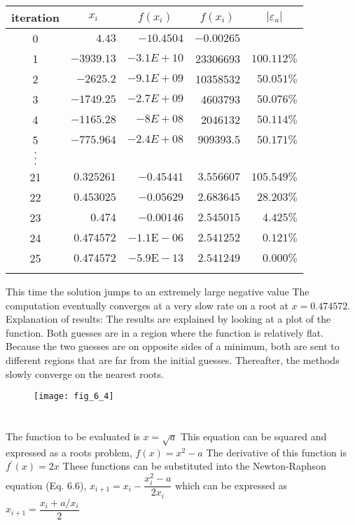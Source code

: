 \documentclass[../main.tex]{subfiles}
\begin{document}
\begin{enumerate}[label=\bfseries(\alph*)]
\begin{tabular}{crrrr}
\Xhline{1.5pt}
iteration & \multicolumn{1}{c}{$x_{i}$} & \multicolumn{1}{c}{$f\left(x_{i}\right)$} & \multicolumn{1}{c}{$f\left(x_{i}\right)$} & \multicolumn{1}{c}{$\left|\varepsilon_{a}\right|$} \\
\hline
0 & $4.43$ & $-10.4504$ & $-0.00265$ &  \\
1 & $-3939.13$ & $-3.1 E+10$ & 23306693 & $100.112 \%$ \\
2 & $-2625.2$ & $-9.1 E+09$ & 10358532 & $50.051 \%$ \\
3 & $-1749.25$ & $-2.7 E+09$ & 4603793 & $50.076 \%$ \\
4 & $-1165.28$ & $-8 E+08$ & 2046132 & $50.114 \%$ \\
5 & $-775.964$ & $-2.4 E+08$ & $909393.5$ & $50.171 \%$ \\
$.$ &  &  &  &  \\
$.$ &  &  &  &  \\
$.$ &  &  &  &  \\
21 & $0.325261$ & $-0.45441$ & $3.556607$ & $105.549 \%$ \\
22 & $0.453025$ & $-0.05629$ & $2.683645$ & $28.203 \%$ \\
23 & $0.474$ & $-0.00146$ & $2.545015$ & $4.425 \%$ \\
24 & $0.474572$ & $-1.1 \mathrm{E}-06$ & $2.541252$ & $0.121 \%$ \\
25 & $0.474572$ & $-5.9 \mathrm{E}-13$ & $2.541249$ & $0.000 \%$ \\
\Xhline{1.5pt}
\end{tabular}
\bigbreak
This time the solution jumps to an extremely large negative value The computation eventually converges at a very slow rate on a root at $x=0.474572$.
\bigbreak
Explanation of results: The results are explained by looking at a plot of the function. Both guesses are in a region where the function is relatively flat. Because the two guesses are on opposite sides of a minimum, both are sent to different regions that are far from the initial guesses. Thereafter, the methods slowly converge on the nearest roots.
\bigbreak
\begin{figure}[H]
		\hspace*{0.8cm}\texttt{[image: fig\_6\_4]}
		\label{fig:fig_6_4}
	\end{figure}
	\bigbreak

\bigbreak
\section{}
The function to be evaluated is
\bigbreak
$x=\sqrt{a}$
\bigbreak
This equation can be squared and expressed as a roots problem,
\bigbreak
$f(x)=x^{2}-a$
\bigbreak
The derivative of this function is
\bigbreak
$f^{\prime}(x)=2 x$
\bigbreak
These functions can be substituted into the Newton-Raphson equation (Eq. 6.6),
\bigbreak
$x_{i+1}=x_{i}-\dfrac{x_{i}^{2}-a}{2 x_{i}}$
\bigbreak
which can be expressed as
\bigbreak
$x_{i+1}=\dfrac{x_{i}+a / x_{i}}{2}$
\bigbreak
\end{enumerate}
\end{document}
